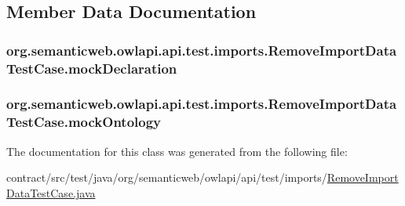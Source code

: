 \subsection{Member Data Documentation}
\hypertarget{classorg_1_1semanticweb_1_1owlapi_1_1api_1_1test_1_1imports_1_1_remove_import_data_test_case_a83218e93823e6c9e7142c30409f2dc30}{
\subsubsection[{mock\-Declaration}]{ org.\-semanticweb.\-owlapi.\-api.\-test.\-imports.\-Remove\-Import\-Data\-Test\-Case.\-mock\-Declaration\hspace{0.3cm}{\ttfamily [private]}}}\label{classorg_1_1semanticweb_1_1owlapi_1_1api_1_1test_1_1imports_1_1_remove_import_data_test_case_a83218e93823e6c9e7142c30409f2dc30}
\hypertarget{classorg_1_1semanticweb_1_1owlapi_1_1api_1_1test_1_1imports_1_1_remove_import_data_test_case_ae7ff01aab8e6d8f0584968df56cb6dbc}{
\subsubsection[{mock\-Ontology}]{ org.\-semanticweb.\-owlapi.\-api.\-test.\-imports.\-Remove\-Import\-Data\-Test\-Case.\-mock\-Ontology\hspace{0.3cm}{\ttfamily [private]}}}\label{classorg_1_1semanticweb_1_1owlapi_1_1api_1_1test_1_1imports_1_1_remove_import_data_test_case_ae7ff01aab8e6d8f0584968df56cb6dbc}


The documentation for this class was generated from the following file\-:\begin{DoxyCompactItemize}
\item 
contract/src/test/java/org/semanticweb/owlapi/api/test/imports/\hyperlink{_remove_import_data_test_case_8java}{Remove\-Import\-Data\-Test\-Case.\-java}\end{DoxyCompactItemize}
